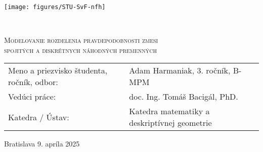 \thispagestyle{empty}

\begin{center}%
	\texttt{[image: figures/STU-SvF-nfh]}
\end{center}
\vspace{1cm}

\begin{flushright}
	\\
\end{flushright}
\vspace{3cm}

\begin{center}
	\textsc{\LARGE Modelovanie rozdelenia pravdepodobnosti zmesi}\\
	\vspace{2pt}
	\textsc{\LARGE spojitých a diskrétnych náhodných premenných}
\end{center}
\vfill

\noindent
\begin{tabular}{ll}
	Meno a priezvisko študenta, ročník, odbor: & Adam Harmaniak, 3. ročník, B-MPM\\
	Vedúci práce: & doc. Ing. Tomáš Bacigál, PhD.\\
	Katedra / Ústav: & Katedra matematiky a deskriptívnej geometrie
\end{tabular}
\vspace{3cm}

\begin{center}
	\Large Bratislava 9. apríla 2025 %
\end{center}
\restoregeometry
\newpage

\

